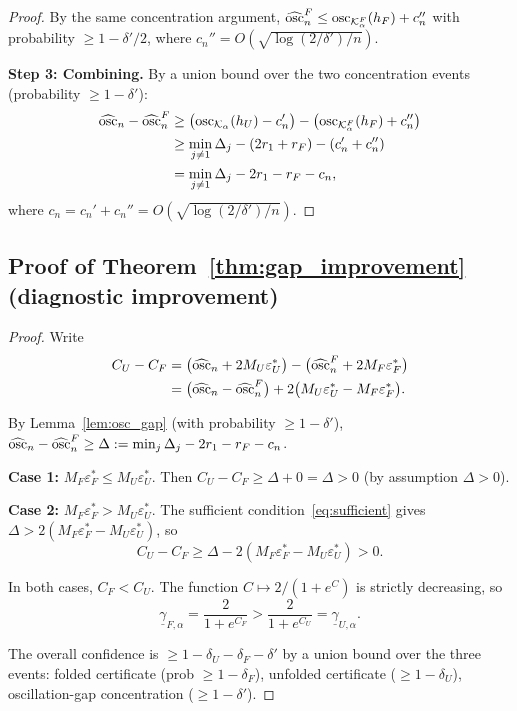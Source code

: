 \begin{proof}
  By the same concentration argument,
  $\widehat{\mathrm{osc}}_n^F \leq \mathrm{osc}_{\mathcal{K}_\alpha^F}(h_F) + c_n''$
  with probability $\geq 1 - \delta'/2$, where
  $c_n'' = O(\sqrt{\log(2/\delta')/n})$.

  \textbf{Step 3: Combining.}
  By a union bound over the two concentration events
  (probability $\geq 1 - \delta'$):
  \begin{align*}
    \widehat{\mathrm{osc}}_n - \widehat{\mathrm{osc}}_n^F
    &\geq \bigl(\mathrm{osc}_{\mathcal{K}_\alpha}(h_U) - c_n'\bigr)
    - \bigl(\mathrm{osc}_{\mathcal{K}_\alpha^F}(h_F) + c_n''\bigr) \\
    &\geq \min_{j \neq 1}\Delta_j - (2r_1 + r_F) - (c_n' + c_n'')
    \\
    &= \min_{j \neq 1}\Delta_j - 2r_1 - r_F - c_n,
  \end{align*}
  where $c_n = c_n' + c_n'' = O(\sqrt{\log(2/\delta')/n})$.
\end{proof}


\subsection{Proof of Theorem~\ref{thm:gap_improvement}
  (diagnostic improvement)}
\label{app:proof_gap}

\begin{proof}
  Write
  \begin{align*}
    C_U - C_F
    &= \bigl(\widehat{\mathrm{osc}}_n + 2M_U\varepsilon_U^*\bigr)
    - \bigl(\widehat{\mathrm{osc}}_n^F + 2M_F\varepsilon_F^*\bigr) \\
    &= \bigl(\widehat{\mathrm{osc}}_n - \widehat{\mathrm{osc}}_n^F\bigr)
    + 2\bigl(M_U\varepsilon_U^* - M_F\varepsilon_F^*\bigr).
  \end{align*}

  By Lemma~\ref{lem:osc_gap} (with probability
  $\geq 1 - \delta'$),
  $\widehat{\mathrm{osc}}_n - \widehat{\mathrm{osc}}_n^F \geq \Delta
  := \min_j \Delta_j - 2r_1 - r_F - c_n$.

  \textbf{Case 1:}
  $M_F\varepsilon_F^* \leq M_U\varepsilon_U^*$.
  Then $C_U - C_F \geq \Delta + 0 = \Delta > 0$
  (by assumption $\Delta > 0$).

  \textbf{Case 2:}
  $M_F\varepsilon_F^* > M_U\varepsilon_U^*$.
  The sufficient condition~\eqref{eq:sufficient} gives
  $\Delta > 2(M_F\varepsilon_F^* - M_U\varepsilon_U^*)$, so
  \[
    C_U - C_F
    \geq \Delta - 2(M_F\varepsilon_F^* - M_U\varepsilon_U^*) > 0.
  \]

  In both cases, $C_F < C_U$.  The function
  $C \mapsto 2/(1 + e^C)$ is strictly decreasing, so
  \[
    \underline{\gamma}_{F,\alpha}
    = \frac{2}{1 + e^{C_F}}
    > \frac{2}{1 + e^{C_U}}
    = \underline{\gamma}_{U,\alpha}.
  \]

  The overall confidence is $\geq 1 - \delta_U - \delta_F - \delta'$
  by a union bound over the three events:
  folded certificate (prob $\geq 1 - \delta_F$),
  unfolded certificate ($\geq 1 - \delta_U$),
  oscillation-gap concentration ($\geq 1 - \delta'$).
\end{proof}


